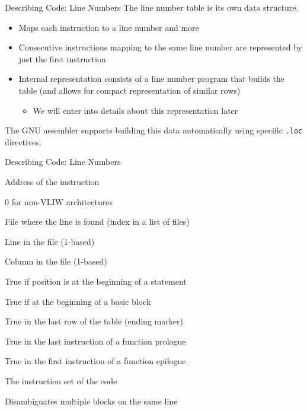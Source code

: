 \begin{frame}{Describing Code: Line Numbers}
The \alert{line number table} is its own data structure.\\
\begin{itemize}
\item Maps each instruction to a line number and more
\item Consecutive instructions mapping to the same line number are
	represented by just the first instruction
\item Internal representation consists of a \alert{line number program} 
	that builds the table (and allows for compact representation of
	similar rows)
	\begin{itemize}
	\item We will enter into details about this representation later
	\end{itemize}
\end{itemize}
\medskip
The GNU assembler supports building this data automatically using specific 
\texttt{.loc} directives.
\end{frame}


\begin{frame}{Describing Code: Line Numbers}
\begin{description}
\item[Address] Address of the instruction
\item[Op. Index] 0 for non-VLIW architectures
\item[File] File where the line is found (index in a list of files)
\item[Line] Line in the file (1-based)
\item[Column] Column in the file (1-based)
\item[Is Statement] True if position is at the beginning of a statement
\item[Basic Block] True if at the beginning of a basic block
\item[End Sequence] True in the last row of the table (ending marker)
\item[Prologue End] True in the last instruction of a function prologue
\item[Epilogue Begin] True in the first instruction of a function epilogue
\item[ISA] The instruction set of the code
\item[Discriminator] Disambiguates multiple blocks on the same line
\end{description}
\end{frame}

